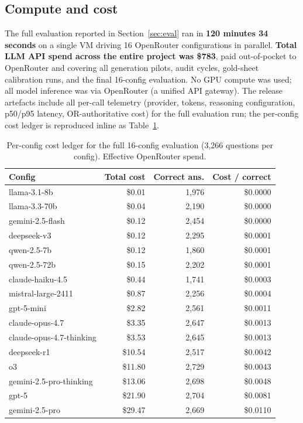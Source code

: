 \subsection{Compute and cost}

The full evaluation reported in Section~\ref{sec:eval} ran in
\textbf{120 minutes 34 seconds} on a single VM driving 16 OpenRouter
configurations in parallel. \textbf{Total LLM API spend across the
entire project was \$783}, paid out-of-pocket to OpenRouter and
covering all generation pilots, audit cycles, gold-sheet calibration
runs, and the final 16-config evaluation. No GPU compute was used;
all model inference was via OpenRouter (a unified API gateway). The
release artefacts include all per-call telemetry (provider, tokens,
reasoning configuration, p50/p95 latency, OR-authoritative cost) for
the full evaluation run; the per-config cost ledger is reproduced
inline as Table~\ref{tab:cost-ledger-app}.

\begin{table}[h]
  \centering
  \footnotesize
  \caption{Per-config cost ledger for the full 16-config evaluation
    (3{,}266 questions per config). Effective OpenRouter spend.}
  \label{tab:cost-ledger-app}
  \begin{tabular}{lrrr}
    \toprule
    Config & Total cost & Correct ans. & Cost / correct \\
    \midrule
    llama-3.1-8b               & \$0.01 & 1{,}976 & \$0.0000 \\
    llama-3.3-70b              & \$0.04 & 2{,}190 & \$0.0000 \\
    gemini-2.5-flash           & \$0.12 & 2{,}454 & \$0.0000 \\
    deepseek-v3                & \$0.12 & 2{,}295 & \$0.0001 \\
    qwen-2.5-7b                & \$0.12 & 1{,}860 & \$0.0001 \\
    qwen-2.5-72b               & \$0.15 & 2{,}202 & \$0.0001 \\
    claude-haiku-4.5           & \$0.44 & 1{,}741 & \$0.0003 \\
    mistral-large-2411         & \$0.87 & 2{,}256 & \$0.0004 \\
    gpt-5-mini                 & \$2.82 & 2{,}561 & \$0.0011 \\
    claude-opus-4.7            & \$3.35 & 2{,}647 & \$0.0013 \\
    claude-opus-4.7-thinking   & \$3.53 & 2{,}645 & \$0.0013 \\
    deepseek-r1                & \$10.54 & 2{,}517 & \$0.0042 \\
    o3                         & \$11.80 & 2{,}729 & \$0.0043 \\
    gemini-2.5-pro-thinking    & \$13.06 & 2{,}698 & \$0.0048 \\
    gpt-5                      & \$21.90 & 2{,}704 & \$0.0081 \\
    gemini-2.5-pro             & \$29.47 & 2{,}669 & \$0.0110 \\
    \bottomrule
  \end{tabular}
\end{table}

